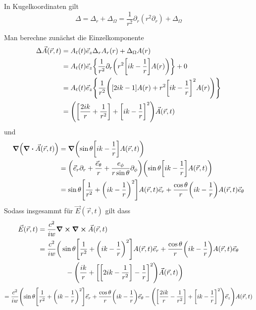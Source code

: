 \begin{enumerate}[label=\alph*)]
    In Kugelkoordinaten gilt
    \begin{equation*}
      \Delta = \Delta_r + \Delta_\Omega = 
      \frac{1}{r^2}\partial_r(r^2\partial_r) 
      + \Delta_\Omega
    \end{equation*}

    Man berechne zunächst die Einzelkomponente
    \begin{equation}
      \begin{split}
        \Delta \vec A(\vec r, t)
        &=A_t(t)\vec e_z\Delta_r A_r(r) + \Delta_\Omega A(r)\\
        &=A_t(t)\vec e_z \qty{\frac{1}{r^2}\partial_r
        \qty(r^2\qty[ik-\frac{1}{r}]A(r))} + 0\\
        &=A_t(t)\vec e_z \qty{\frac{1}{r^2}
        \qty([2ik-1]A(r) + r^2\qty[ik-\frac{1}{r}]^2A(r))}\\
        &=
        \qty(\qty[\frac{2ik}{r} +\frac{1}{r^2}] 
        + \qty[ik-\frac{1}{r}]^2)\vec A(\vec r,t)\\
      \end{split}
    \end{equation}
    und
    \begin{equation}
      \begin{split}
        \grad(\div\vec A(\vec r, t))
        &=\grad
        \qty(\sin\theta\qty[ik-\frac{1}{r}] A(\vec r, t))\\
        &=\qty(\vec e_r \partial_r + \frac{\vec e_\theta}{r} +
        \frac{e_\phi}{r\sin\theta} \partial_\phi)
        \qty(\sin\theta\qty[ik-\frac{1}{r}] A(\vec r, t))\\
        &=\sin\theta\qty[\frac{1}{r^2} +
        \qty(ik - \frac{1}{r})^2]A(\vec r, t)\vec e_r
        + \frac{\cos\theta}{r}\qty(ik-\frac{1}{r})A(\vec r,t)\vec e_\theta
      \end{split}
    \end{equation}
    Sodass insgesammt für $\vec E(\vec r, t)$ gilt dass
    \begin{equation}
      \begin{split}
        \vec E(\vec r, t)
        &=\frac{c^2}{iw}\curl\curl \vec A(\vec r, t)\\
        &=\frac{c^2}{iw}\bigg(
          \sin\theta\qty[\frac{1}{r^2} +
          \qty(ik - \frac{1}{r})^2]A(\vec r, t)\vec e_r
          + \frac{\cos\theta}{r}\qty(ik-\frac{1}{r})A(\vec r,t)\vec e_\theta
        \\&\qquad\qquad
        -\qty(\frac{ik}{r}+\qty[
        \qty[2ik-\frac{1}{r^2}]-\frac{1}{r}]^2)\vec A(\vec r,t)
        \bigg)\\
      \end{split}
    \end{equation}
    \begin{equation*}
        =\frac{c^2}{iw}\qty(
          \sin\theta\qty[\frac{1}{r^2} +
          \qty(ik - \frac{1}{r})^2]\vec e_r
          + \frac{\cos\theta}{r}\qty(ik-\frac{1}{r})\vec e_\theta
          -\qty(
          \qty[
            \frac{2ik}{r}-\frac{1}{r^2} 
          ]+\qty[ik-\frac{1}{r}]^2)\vec e_z
      )A(\vec r, t)\\
    \end{equation*}


\end{enumerate}
